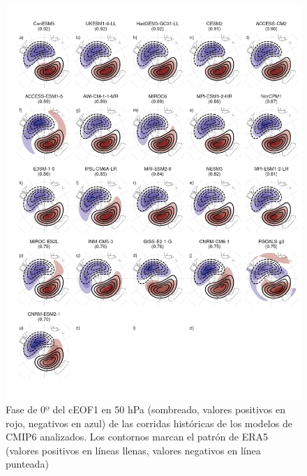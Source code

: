 \documentclass[12pt,oneside,a4paper]{reedthesis}
\begin{document}
\begin{figure}

{\centering \includegraphics{figures/50-cmip6/todos-ceof1-1} 

}

\caption{Fase de 0º del cEOF1 en 50 hPa (sombreado, valores positivos en rojo, negativos en azul) de las corridas históricas de los modelos de CMIP6 analizados. Los contornos marcan el patrón de ERA5 (valores positivos en líneas llenas, valores negativos en línea punteada)}\label{fig:todos-ceof1}
\end{figure}
\end{document}
